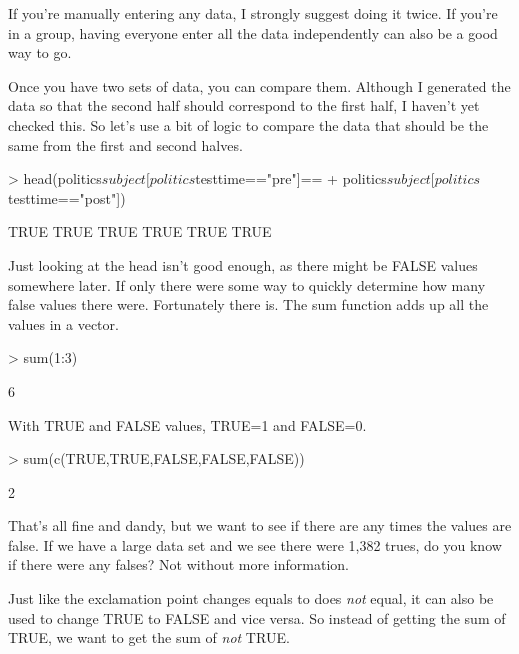 \documentclass[12pt]{article}
\begin{document}
If you're manually entering any data, I strongly suggest doing it twice. If you're
in a group, having everyone enter all the data independently can also be a good
way to go.

Once you have two sets of data, you can compare them. Although I generated the
data so that the second half should correspond to the first half, I haven't yet
checked this. So let's use a bit of logic to compare the data that should be
the same from the first and second halves.

\begin{Schunk}
\begin{Sinput}
> head(politics$subject[politics$testtime=="pre"]==
+     politics$subject[politics$testtime=="post"])
\end{Sinput}
\begin{Soutput}
[1] TRUE TRUE TRUE TRUE TRUE TRUE
\end{Soutput}
\end{Schunk}

Just looking at the head isn't good enough, as there might be FALSE values
somewhere later. If only there were some way to quickly determine how many
false values there were. Fortunately there is. The sum function adds up 
all the values in a vector.

\begin{Schunk}
\begin{Sinput}
> sum(1:3)
\end{Sinput}
\begin{Soutput}
[1] 6
\end{Soutput}
\end{Schunk}

With TRUE and FALSE values, TRUE=1 and FALSE=0.

\begin{Schunk}
\begin{Sinput}
> sum(c(TRUE,TRUE,FALSE,FALSE,FALSE))
\end{Sinput}
\begin{Soutput}
[1] 2
\end{Soutput}
\end{Schunk}

That's all fine and dandy, but we want to see if there are any times the values
are false. If we have a large data set and we see there were 1,382 trues, do
you know if there were any falses? Not without more information.

Just like the exclamation point changes equals to does \emph{not} equal, it can
also be used to change TRUE to FALSE and vice versa. So instead of getting the
sum of TRUE, we want to get the sum of \emph{not} TRUE.
\end{document}
